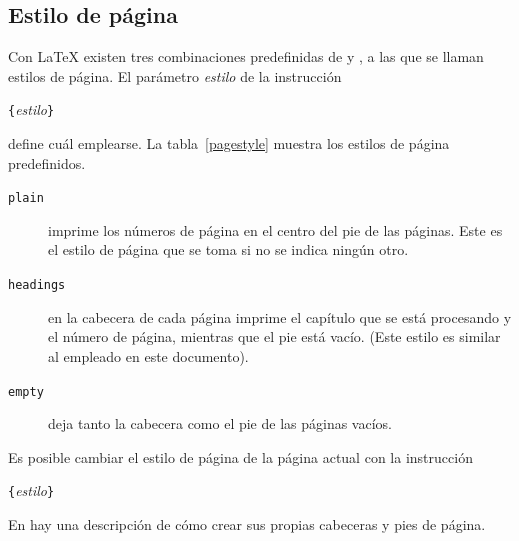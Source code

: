 \clearpage
%
%

\subsection{Estilo de p\'agina}

Con \LaTeX{} existen tres combinaciones predefinidas de
 y , a las que se llaman estilos
de p\'agina. El
par\'ametro \emph{estilo} de la instrucci\'on
%
%
%
%
%
%
\begin{command}
\verb|{|\emph{estilo}\verb|}|
\end{command}
\noindent define cu\'al emplearse. La tabla~\ref{pagestyle} muestra
los estilos de p\'agina predefinidos.

\begin{table}[!hbp]
\caption{Estilos de p\'agina predefinidos en \LaTeX}
\label{pagestyle}
\begin{description}

\item[\normalfont\texttt{plain}] imprime los n\'umeros de p\'agina en el
  centro del pie de las p\'aginas. Este es el estilo de p\'agina que se
  toma si no se indica ning\'un otro.

\item[\normalfont\texttt{headings}] en la cabecera de cada p\'agina
  imprime el cap\'itulo que se est\'a procesando y el n\'umero de
  p\'agina, mientras que el pie est\'a vac\'io. (Este estilo es similar
  al empleado en este documento).

\item[\normalfont\texttt{empty}] deja tanto la cabecera como el pie
  de las p\'aginas vac\'ios.

\end{description}

\end{table}

Es posible cambiar el estilo de p\'agina de la p\'agina actual con
la instrucci\'on
\begin{command}
\verb|{|\emph{estilo}\verb|}|
\end{command}
En \companion{} hay una descripci\'on de c\'omo crear sus propias
cabeceras y pies de p\'agina.
%
%

